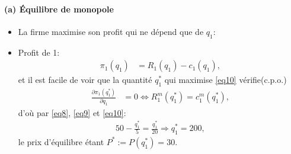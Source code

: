     \begin{frame}[allowframebreaks]{\insertsection}
\framesubtitle{(a) Équilibre de monopole}
        \begin{itemize}
            \item La firme maximise son profit qui ne dépend que de $q_1$:
            \item Profit de 1: 
            \begin{align}
                \pi_1(q_1) &=R_1(q_1) - c_1(q_1),
                \label{eq10}
            \end{align}
            et il est facile de voir que la quantité $q_1^*$ qui maximise \eqref{eq10} vérifie(c.p.o.)
            \begin{align}
                \frac{\partial \pi_1(q_1^*)}{\partial q_1} &= 0 \Leftrightarrow  R^m_1(q_1^*) = c^m_1(q_1^*),
                \label{eq11}
            \end{align}
            d'où par \eqref{eq8}, \eqref{eq9} et \eqref{eq10}:
            \begin{align*}
                 50-\frac{q_1^*}{5}=\frac{q_1^*}{20} \Rightarrow q_1^* = 200,
            \end{align*}
            le prix d'équilibre étant $P^* := P(q_1^*) = 30$.
        \end{itemize}
    \end{frame}   


